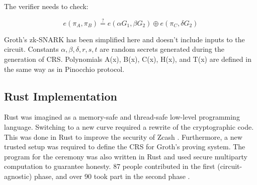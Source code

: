 \noindent The verifier needs to check:

$$ e(\pi_A, \pi_B) \stackrel{?}{=} e(\alpha G_1, \beta G_2) \oplus e(\pi_C, \delta G_2) $$

\noindent Groth's zk-SNARK has been simplified here and doesn't include inputs to the circuit. Constants $\alpha, \beta, \delta, r, s, t$ are random secrets generated during the generation of CRS. Polynomials A(x), B(x), C(x), H(x), and T(x) are defined in the same way as in Pinocchio \cite{parno2013pinocchio} protocol.

\subsection{Rust Implementation}
\label{section:rust}
Rust \cite{rustlang} was imagined as a memory-safe and thread-safe low-level programming language. Switching to a new curve required a rewrite of the cryptographic code. This was done in Rust to improve the security of Zcash \cite{zcashbellman}. Furthermore, a new trusted setup was required to define the CRS for Groth's proving system. The program for the ceremony was also written in Rust and used secure multiparty computation to guarantee honesty. 87 people contributed in the first (circuit-agnostic) phase, and over 90 took part in the second phase \cite{zcashparamgen}.